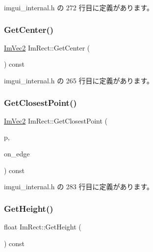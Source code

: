  imgui\+\_\+internal.\+h の 272 行目に定義があります。

\mbox{\label{struct_im_rect_aae13f8003184fd84f29d27c3c074cf43}} 
\subsubsection{\texorpdfstring{Get\+Center()}{GetCenter()}}
{\footnotesize\ttfamily \mbox{\hyperlink{struct_im_vec2}{Im\+Vec2}} Im\+Rect\+::\+Get\+Center (\begin{DoxyParamCaption}{ }\end{DoxyParamCaption}) const\hspace{0.3cm}{\ttfamily [inline]}}



 imgui\+\_\+internal.\+h の 265 行目に定義があります。

\mbox{\label{struct_im_rect_a223c67d4c93e5c87a33a68ebb527bbb8}} 
\subsubsection{\texorpdfstring{Get\+Closest\+Point()}{GetClosestPoint()}}
{\footnotesize\ttfamily \mbox{\hyperlink{struct_im_vec2}{Im\+Vec2}} Im\+Rect\+::\+Get\+Closest\+Point (\begin{DoxyParamCaption}\item[{\mbox{\hyperlink{struct_im_vec2}{Im\+Vec2}}}]{p,  }\item[{bool}]{on\+\_\+edge }\end{DoxyParamCaption}) const\hspace{0.3cm}{\ttfamily [inline]}}



 imgui\+\_\+internal.\+h の 283 行目に定義があります。

\mbox{\label{struct_im_rect_a748d8ae9cb26508951ec6e2f2df0625b}} 
\subsubsection{\texorpdfstring{Get\+Height()}{GetHeight()}}
{\footnotesize\ttfamily float Im\+Rect\+::\+Get\+Height (\begin{DoxyParamCaption}{ }\end{DoxyParamCaption}) const\hspace{0.3cm}{\ttfamily [inline]}}



